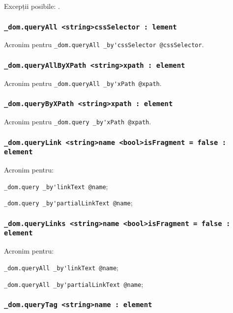 Excepții posibile: .

\subsubsection{\lstinline|_dom.queryAll <string>cssSelector : lement|}

Acronim pentru \lstinline|_dom.queryAll _by'cssSelector @cssSelector|.

\subsubsection{\lstinline|_dom.queryAllByXPath <string>xpath : element|}

Acronim pentru \lstinline|_dom.queryAll _by'xPath @xpath|.

\subsubsection{\lstinline|_dom.queryByXPath <string>xpath : element|}

Acronim pentru \lstinline|_dom.query _by'xPath @xpath|.

\subsubsection{\lstinline|_dom.queryLink <string>name <bool>isFragment = false : element|}

Acronim pentru:
\begin{icItems}
	\item \lstinline|_dom.query _by'linkText @name|;
	\item \lstinline|_dom.query _by'partialLinkText @name|;
\end{icItems}

\subsubsection{\lstinline|_dom.queryLinks <string>name <bool>isFragment = false : element|}

Acronim pentru:
\begin{icItems}
	\item \lstinline|_dom.queryAll _by'linkText @name|;
	\item \lstinline|_dom.queryAll _by'partialLinkText @name|;
\end{icItems}

\subsubsection{\lstinline|_dom.queryTag <string>name : element|}

